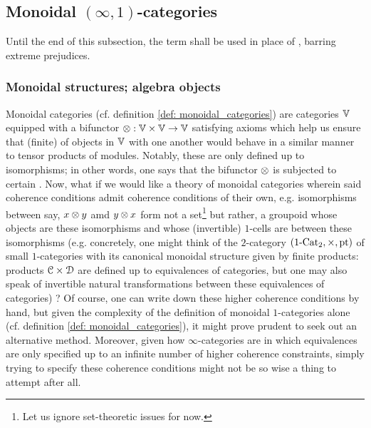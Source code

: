         \subsection{Monoidal \texorpdfstring{$(\infty, 1)$}{}-categories}
            \begin{convention}
                Until the end of this subsection, the term  shall be used in place of , barring extreme prejudices.
            \end{convention}
        
            \subsubsection{Monoidal structures; algebra objects}
                Monoidal categories (cf. definition \ref{def: monoidal_categories}) are categories $\mathbb{V}$ equipped with a bifunctor $\tensor: \V \x \V \to \V$ satisfying axioms which help us ensure that (finite)  of objects in $\mathbb{V}$ with one another would behave in a similar manner to tensor products of modules. Notably, these  are only defined up to isomorphisms; in other words, one says that the bifunctor $\tensor$ is subjected to certain . Now, what if we would like a theory of monoidal categories wherein said coherence conditions admit coherence conditions of their own, e.g. isomorphisms between say, $x \tensor y$ amd $y \tensor x$ form not a set\footnote{Let us ignore set-theoretic issues for now.} but rather, a groupoid whose objects are these isomorphisms and whose (invertible) $1$-cells are  between these isomorphisms (e.g. concretely, one might think of the $2$-category $(1\-\Cat_2, \x, \pt)$ of small $1$-categories with its canonical monoidal structure given by finite products: products $\C \x \D$ are defined up to equivalences of categories, but one may also speak of invertible natural transformations between these equivalences of categories) ? Of course, one can write down these higher coherence conditions by hand, but given the complexity of the definition of monoidal $1$-categories alone (cf. definition \ref{def: monoidal_categories}), it might prove prudent to seek out an alternative method. Moreover, given how $\infty$-categories are  in which equivalences are only specified up to an infinite number of higher coherence constraints, simply trying to specify these coherence conditions might not be so wise a thing to attempt after all.
                
